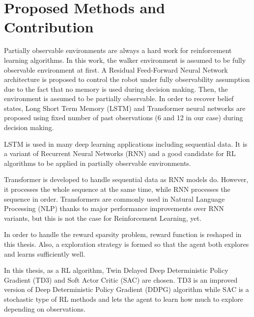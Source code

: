 \section{Proposed Methods and Contribution}
\label{sec:proposed_methods}

Partially observable environments are always a hard work for reinforcement learning algorithms. 
In this work, the walker environment is assumed to be fully observable environment at first. 
A Residual Feed-Forward Neural Network architecture is proposed to control 
the robot under fully observability assumption due to the fact that no memory is used during decision making. 
Then, the environment is assumed to be partially observable. 
In order to recover belief states, Long Short Term Memory (LSTM) and 
Transformer neural networks are proposed using fixed number of 
past observations (6 and 12 in our case) during decision making. 

LSTM is used in many deep learning applications including sequential data. 
It is a variant of Recurrent Neural Networks (RNN) and a good candidate for RL algorithms to be applied in partially observable environments. 

Transformer is developed to handle sequential data as RNN models do. 
However, it processes the whole sequence at the same time, while RNN processes the sequence in order. 
Transformers are commonly used in Natural Language Processing (NLP) thanks to major performance improvements over RNN variants, but this is not the case for Reinforcement Learning, yet.

In order to handle the reward sparsity problem, reward function is reshaped in this thesis. Also, a exploration strategy is formed so that the agent both explores and learns sufficiently well. 

In this thesis, as a RL algorithm, Twin Delayed Deep Deterministic Policy Gradient (TD3) and Soft Actor Critic (SAC) are chosen. 
TD3 is an improved version of Deep Deterministic Policy Gradient (DDPG) algorithm while SAC is a stochastic type of RL methods and lets the agent to learn how much to explore depending on observations.
